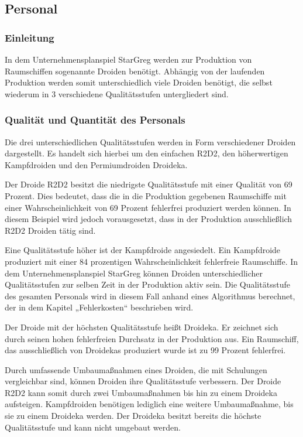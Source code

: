 \subsection{Personal}
\label{sub:Personal}
\subsubsection{Einleitung}
In dem Unternehmensplanspiel StarGreg werden zur Produktion von Raumschiffen sogenannte Droiden benötigt.   Abhängig von der laufenden Produktion  werden somit unterschiedlich viele Droiden benötigt, die selbst wiederum in 3 verschiedene Qualitätsstufen untergliedert sind.

\subsubsection{Qualität und Quantität des Personals}
Die drei unterschiedlichen Qualitätsstufen werden in Form verschiedener Droiden dargestellt. Es handelt sich hierbei um den einfachen R2D2, den höherwertigen Kampfdroiden und den Permiumdroiden Droideka.

Der Droide R2D2 besitzt die niedrigste Qualitätsstufe mit einer Qualität von 69 Prozent. Dies bedeutet, dass die in die Produktion gegebenen Raumschiffe mit einer Wahrscheinlichkeit von 69 Prozent fehlerfrei produziert werden können. In diesem Beispiel wird  jedoch vorausgesetzt, dass in der Produktion ausschließlich R2D2 Droiden tätig sind.  

Eine Qualitätsstufe höher ist der Kampfdroide angesiedelt. Ein Kampfdroide produziert mit einer 84 prozentigen Wahrscheinlichkeit fehlerfreie Raumschiffe. In dem Unternehmensplanspiel StarGreg können Droiden unterschiedlicher Qualitätsstufen zur selben Zeit in der Produktion aktiv sein. Die Qualitätsstufe des gesamten Personals wird in diesem Fall anhand eines Algorithmus berechnet, der in dem Kapitel „Fehlerkosten“ beschrieben wird.

Der Droide mit der höchsten Qualitätsstufe heißt Droideka. Er zeichnet sich durch seinen hohen fehlerfreien Durchsatz in der Produktion aus. Ein Raumschiff, das ausschließlich von Droidekas produziert wurde ist zu 99 Prozent fehlerfrei. 

Durch umfassende Umbaumaßnahmen eines Droiden, die mit Schulungen vergleichbar sind, können Droiden ihre Qualitätsstufe verbessern. Der Droide R2D2 kann somit durch zwei Umbaumaßnahmen bis hin zu einem Droideka aufsteigen.  Kampfdroiden benötigen lediglich eine weitere Umbaumaßnahme, bis sie zu einem Droideka werden. Der Droideka besitzt bereits die höchste Qualitätsstufe und kann nicht umgebaut werden.

